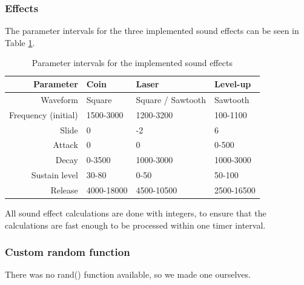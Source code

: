 \subsubsection{Effects}

The parameter intervals for the three implemented sound effects can be seen in Table \ref{tab:sound_effects}.

\begin{table}[ht!]
    \begin{center}
    \begin{tabular}{r|lll}
    Parameter           & Coin       & Laser             & Level-up   \\
    \hline
    Waveform            & Square     & Square / Sawtooth & Sawtooth   \\
    Frequency (initial) & 1500-3000  & 1200-3200         & 100-1100   \\
    Slide               & 0          & -2                & 6          \\
    Attack              & 0          & 0                 & 0-500      \\
    Decay               & 0-3500     & 1000-3000         & 1000-3000  \\
    Sustain level       & 30-80      & 0-50              & 50-100     \\
    Release             & 4000-18000 & 4500-10500        & 2500-16500 \\
    \end{tabular}
    \end{center}
    \caption{Parameter intervals for the implemented sound effects}
    \label{tab:sound_effects}
\end{table}

All sound effect calculations are done with integers, to ensure that the calculations are fast enough to be processed within one timer interval.


\subsubsection{Custom random function}

There was no rand() function available, so we made one ourselves.
